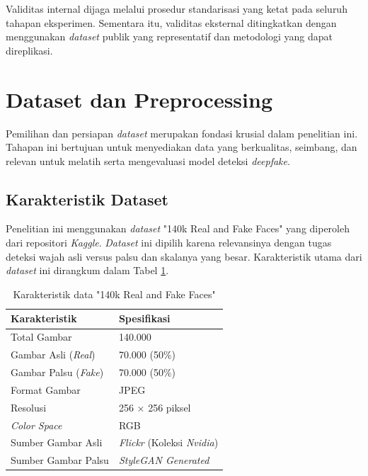 Validitas internal dijaga melalui prosedur standarisasi yang ketat pada seluruh tahapan eksperimen. Sementara itu, validitas eksternal ditingkatkan dengan menggunakan \textit{dataset} publik yang representatif dan metodologi yang dapat direplikasi.

\section{Dataset dan Preprocessing}

Pemilihan dan persiapan \textit{dataset} merupakan fondasi krusial dalam penelitian ini. Tahapan ini bertujuan untuk menyediakan data yang berkualitas, seimbang, dan relevan untuk melatih serta mengevaluasi model deteksi \textit{deepfake}.

\subsection{Karakteristik Dataset}

Penelitian ini menggunakan \textit{dataset} "140k Real and Fake Faces" yang diperoleh dari repositori \textit{Kaggle}. \textit{Dataset} ini dipilih karena relevansinya dengan tugas deteksi wajah asli versus palsu dan skalanya yang besar. Karakteristik utama dari \textit{dataset} ini dirangkum dalam Tabel \ref{tab:dataset_characteristics}.

\begin{table}[H]
\centering
\caption{Karakteristik data "140k Real and Fake Faces"}
\label{tab:dataset_characteristics}
\begin{tabular}{|l|l|}
\hline
\textbf{Karakteristik} & \textbf{Spesifikasi} \\
\hline
Total Gambar & 140.000 \\
Gambar Asli (\textit{Real}) & 70.000 (50\%) \\
Gambar Palsu (\textit{Fake}) & 70.000 (50\%) \\
Format Gambar & JPEG \\
Resolusi & 256 × 256 piksel \\
\textit{Color Space} & RGB \\
Sumber Gambar Asli & \textit{Flickr} (Koleksi \textit{Nvidia}) \\
Sumber Gambar Palsu & \textit{StyleGAN Generated} \\
\hline
\end{tabular}
\end{table}


